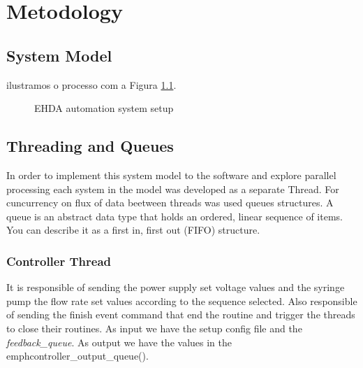 \chapter{Metodology}
\label{chap:Metodology}


\section{System Model}
\label{sec:control_model}

ilustramos o processo com a Figura \ref{fig:control_model_fig}. 

\begin{figure}[thpb]
  \centering
  \caption{EHDA automation system setup}
  \label{fig:control_model_fig}
\end{figure}

\section{Threading and Queues}
\label{sec:concurrency}

    In order to implement this system model to the software and explore parallel processing each system in the
    model was developed as a separate Thread.
    For cuncurrency on flux of data beetween threads was used queues structures.
    A queue is an abstract data type that holds an ordered, linear sequence of items. You can describe it as a first in, first out (FIFO) structure.

    \subsection{Controller Thread}

        It is responsible of sending the power supply set voltage values and the syringe pump the flow rate set values according to the sequence selected.
        Also responsible of sending the finish event command that end the routine and trigger the threads to close their routines.
        As input we have the setup config file and the \emph{feedback\_queue}. As output we have the values in the emph{controller\_output\_queue()}.

